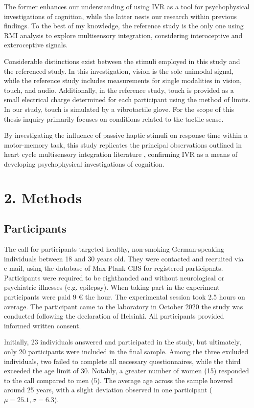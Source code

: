 \documentclass[12pt,oneside,openright]{report}
\begin{document}
The former enhances our understanding of using IVR as a tool for psychophysical investigations of cognition, while the latter nests our research within previous findings. To the best of my knowledge, the reference study is the only one using RMI analysis to explore multisensory integration, considering interoceptive and exteroceptive signals.

Considerable distinctions exist between the stimuli employed in this study and the referenced study. In this investigation, vision is the sole unimodal signal, while the reference study includes measurements for single modalities in vision, touch, and audio. Additionally, in the reference study, touch is provided as a small electrical charge determined for each participant using the method of limits. In our study, touch is simulated by a vibrotactile glove. For the scope of this thesis inquiry primarily focuses on conditions related to the tactile sense.

By investigating the influence of passive haptic stimuli on response time within a motor-memory task, this study replicates the principal observations outlined in heart cycle multisensory integration literature \parencite{SALTAFOSSI2023108642}, confirming IVR as a means of developing psychophysical investigations of cognition.

\section*{2. Methods}
\subsection*{Participants}
The call for participants targeted healthy, non-smoking German-speaking individuals between 18 and 30 years old. They were contacted and recruited via e-mail, using the database of Max-Plank CBS for registered participants. Participants were required to be righthanded and without neurological or psychiatric illnesses (e.g. epilepsy). When taking part in the experiment participants were paid 9 € the hour. The experimental session took 2.5 hours on average. The participant came to the laboratory in October 2020  the study was conducted following the declaration of Helsinki. All participants provided informed written consent. 

Initially, 23 individuals answered and participated in the study, but ultimately, only 20 participants were included in the final sample. Among the three excluded individuals, two failed to complete all necessary questionnaires, while the third exceeded the age limit of 30. Notably, a greater number of women (15) responded to the call compared to men (5). The average age across the sample hovered around 25 years, with a slight deviation observed in one participant ($\mu=25.1, \sigma=6.3$).
\end{document}
